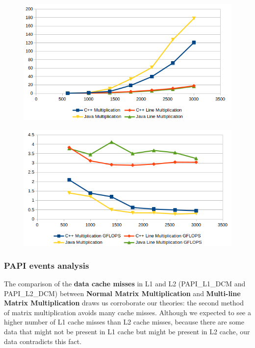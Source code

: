 \begin{figure}[H]
    \begin{minipage}{.5\textwidth}
        \centering
        \includegraphics[width=\linewidth]{img/small_execution_time.png}
        \label{fig:test1}
    \end{minipage}
    \begin{minipage}{.5\textwidth}
        \centering
        \includegraphics[width=\linewidth]{img/small_flops.png}
        \label{fig:test1}
    \end{minipage}%
\end{figure}

\subsubsection{PAPI events analysis}

The comparison of the \textbf{data cache misses} in L1 and L2 (PAPI\_L1\_DCM and PAPI\_L2\_DCM) between \textbf{Normal Matrix Multiplication} and \textbf{Multi-line Matrix Multiplication} draws us corroborate our theories: the second method of matrix multiplication avoids many cache misses. Although we expected to see a higher number of L1 cache misses than L2 cache misses, because there are some data that might not be present in L1 cache but might be present in L2 cache, our data contradicts this fact.

